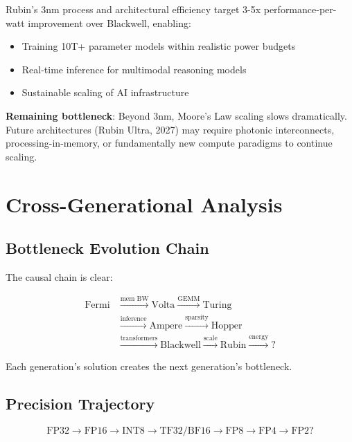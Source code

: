 \documentclass{article}
\begin{document}
Rubin's 3nm process and architectural efficiency target 3-5x performance-per-watt improvement over Blackwell, enabling:
\begin{itemize}
\item Training 10T+ parameter models within realistic power budgets
\item Real-time inference for multimodal reasoning models
\item Sustainable scaling of AI infrastructure
\end{itemize}

\textbf{Remaining bottleneck}: Beyond 3nm, Moore's Law scaling slows dramatically. Future architectures (Rubin Ultra, 2027) may require photonic interconnects, processing-in-memory, or fundamentally new compute paradigms to continue scaling.

\section{Cross-Generational Analysis}

\subsection{Bottleneck Evolution Chain}

The causal chain is clear:

\begin{equation}
\begin{aligned}
\text{Fermi} &\xrightarrow{\text{mem BW}} \text{Volta} \xrightarrow{\text{GEMM}} \text{Turing} \\
&\xrightarrow{\text{inference}} \text{Ampere} \xrightarrow{\text{sparsity}} \text{Hopper} \\
&\xrightarrow{\text{transformers}} \text{Blackwell} \xrightarrow{\text{scale}} \text{Rubin} \xrightarrow{\text{energy}} \text{?}
\end{aligned}
\end{equation}

Each generation's solution creates the next generation's bottleneck.

\subsection{Precision Trajectory}

\begin{equation}
\text{FP32} \to \text{FP16} \to \text{INT8} \to \text{TF32/BF16} \to \text{FP8} \to \text{FP4} \to \text{FP2?}
\end{equation}
\end{document}
